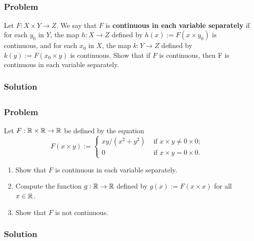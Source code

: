 
\subsection{}

\subsubsection{Problem}
Let $F : X \times Y \to Z$. We say that $F$ is \textbf{continuous in each variable separately} if for each $y_0$ in $Y$, the map $h : X \to Z$ defined by $h(x) := F(x \times y_0)$ is continuous, and for each $x_0$ in $X$, the map $k : Y \to Z$ defined by $k(y) := F(x_0 \times y)$ is continuous. Show that if $F$ is continuous, then F is continuous in each variable separately.

\subsubsection{Solution}
\todo


\subsection{}

\subsubsection{Problem}
Let $F : \mathbb R \times \mathbb R \to \mathbb R$ be defined by the equation
\[ F(x \times y) := 
\left\{ \begin{array}{ll}
    xy/(x^2+y^2) & \mbox{ if } x \times y \neq 0 \times 0 ; \\
    0 & \mbox{ if } x \times y = 0 \times 0.
\end{array} \right. \]
\begin{enumerate}
    \item Show that $F$ is continuous in each variable separately.
    \item Compute the function $g : \mathbb R \to \mathbb R$ defined by $g(x) := F(x \times x)$ for all $x \in \mathbb R$.
    \item Show that $F$ is not continuous.
\end{enumerate}

\subsubsection{Solution}
\todo


